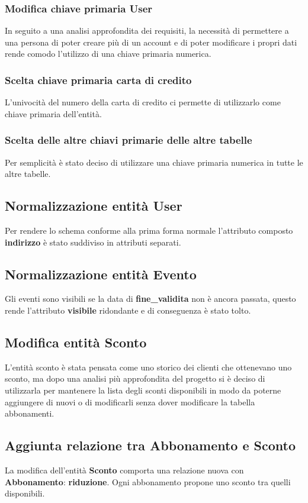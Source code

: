 \subsubsection{Modifica chiave primaria \textbf{User}}
In seguito a una analisi approfondita dei requisiti, la necessità di permettere a una persona di poter creare più di un account e di poter modificare i propri dati rende comodo l'utilizzo di una chiave primaria numerica.  

\subsubsection{Scelta chiave primaria \textbf{carta di credito}}
L'univocità del numero della carta di credito ci permette di utilizzarlo come chiave primaria dell'entità.

\subsubsection{Scelta delle altre chiavi primarie delle altre tabelle}
Per semplicità è stato deciso di utilizzare una chiave primaria numerica in tutte le altre tabelle.

\subsection{Normalizzazione entità \textbf{User}} 
Per rendere lo schema conforme alla prima forma normale l'attributo composto \textbf{indirizzo} è stato suddiviso in attributi separati.

\subsection{Normalizzazione entità \textbf{Evento}}
Gli eventi sono visibili se la data di \textbf{fine{\_}validita} non è ancora passata, questo rende l'attributo \textbf{visibile} ridondante e di conseguenza è stato tolto.

\subsection{Modifica entità Sconto}
L'entità sconto è stata pensata come uno storico dei clienti che ottenevano uno sconto, ma dopo una analisi più approfondita del progetto si è deciso di utilizzarla per mantenere la lista degli sconti disponibili in modo da poterne aggiungere di nuovi o di modificarli senza dover modificare la tabella abbonamenti.  

\subsection{Aggiunta relazione tra Abbonamento e Sconto}
La modifica dell'entità \textbf{Sconto} comporta una relazione nuova con \textbf{Abbonamento}: \textbf{riduzione}. Ogni abbonamento propone uno sconto tra quelli disponibili.

